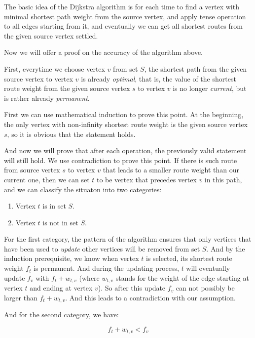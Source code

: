 \documentclass[a4paper,11pt,twocolumn]{article}
\begin{document}
The basic idea of the Dijkstra algorithm is for each time to find a vertex with minimal shortest path weight from the source vertex, and apply tense operation to all edges starting from it, and eventually we can get all shortest routes from the given source vertex settled.

Now we will offer a proof on the accuracy of the algorithm above.

First, everytime we choose vertex $v$ from set $S$, the shortest path from the given source vertex to vertex $v$ is already \emph{optimal}, that is, the value of the shortest route weight from the given source vertex $s$ to vertex $v$ is no longer \emph{current}, but is rather already \emph{permanent}.

First we can use mathematical induction to prove this point. At the beginning, the only vertex with non-infinity shortest route weight is the given source vertex $s$, so it is obvious that the statement holds.

And now we will prove that after each operation, the previously valid statement will still hold. We use contradiction to prove this point. If there is such route from source vertex $s$ to vertex $v$ that leads to a smaller route weight than our current one, then we can set $t$ to be vertex that precedes vertex $v$ in this path, and we can classify the situaton into two categories:

\begin{enumerate}

\item{Vertex $t$ is in set $S$. }
\item{Vertex $t$ is not in set $S$. }

\end{enumerate}

For the first category, the pattern of the algorithm ensures that only vertices that have been used to \emph{update} other vertices will be removed from set $S$. And by the induction prerequisite, we know when vertex $t$ is selected, its shortest route weight $f_t$ is permanent. And during the updating process, $t$ will eventually update $f_v$ with $f_t + w_{t,v}$ (where $w_{t,v}$ stands for the weight of the edge starting at vertex $t$ and ending at vertex $v$). So after this update $f_v$ can not possibly be larger than $f_t + w_{t,v}$. And this leads to a contradiction with our assumption.

And for the second category, we have:

\begin{equation}
f_t+w_{t,v}<f_v\label{cont}
\end{equation}
\end{document}
